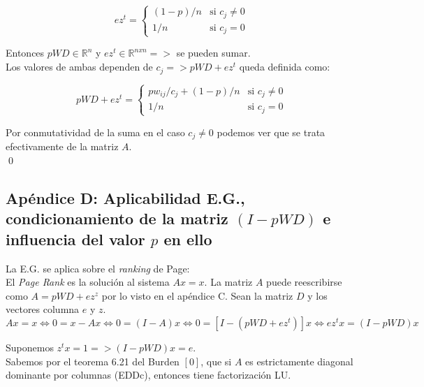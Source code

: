 		\[
			        ez^{t} = \begin{cases}
						(1-p)/n & \text{si } c_{j} \neq 0 \\
						 1   /n & \text{si } c_{j}   =  0
					 \end  {cases}
		\]

		Entonces $pWD \in \mathbb{R}^{n}$ y $ez^{t} \in \mathbb{R}^{nxn} =>$ se pueden sumar. \\

		Los valores de ambas dependen de $c_j => pWD+ez^t$ queda definida como:

		\[
			        pWD+ez^{t} = 	\begin{cases}
							pw_{ij}/c_j+(1-p)/n & \text{si } c_{j} \neq 0 \\
								     1   /n & \text{si } c_{j}   =  0
						\end  {cases}
		\]

		Por conmutatividad de la suma en el caso $c_j \neq 0$ podemos ver que se trata efectivamente de la matriz $A$. \\

		\qed

	\clearpage

	\subsection{Apéndice D: Aplicabilidad E.G., condicionamiento de la matriz $(I-pWD)$ e influencia del valor $p$ en ello}

		La E.G. se aplica sobre el \textit{ranking} de Page: \\

		El \textit{Page Rank} es la solución al sistema $Ax=x$. La matriz $A$ puede reescribirse como $A=pWD+ez^{z}$ por lo visto en el apéndice C. Sean la matriz $D$ y los vectores columna $e$ y $z$. \\

		\begin{equation}
			Ax=x \Leftrightarrow 0 = x-Ax \Leftrightarrow 0 = (I-A)x \Leftrightarrow 0 = [I - (pWD+ez^{t})]x \Leftrightarrow ez^{t}x = (I-pWD)x
		\end{equation}

		Suponemos $z^{t}x = 1 => (I-pWD)x = e$. \\

		Sabemos por el teorema 6.21 del Burden $[0]$, que si $A$ es estrictamente diagonal dominante por columnas (EDDc), entonces tiene factorización LU. \\ %

